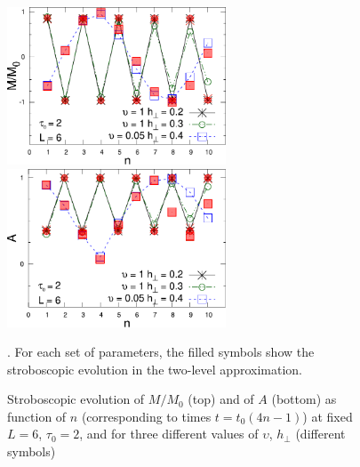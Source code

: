 \begin{figure}[t]
\centering
\includegraphics[width=6.5cm]{imm/strobM.pdf}\\
\includegraphics[width=6.5cm]{imm/strobA.pdf}
\caption{Stroboscopic evolution of $M/M_0$ (top) and of $A$ (bottom) as function of  $n$ (corresponding to times $t=t_0(4n-1)$) at fixed $L=6$, $\tau_0=2$, and for three different values of $\upsilon$, $h_\perp$ (different symbols)}. For each set of parameters, the filled symbols show the stroboscopic evolution in the two-level approximation.\label{fig:strobo}
\end{figure}

